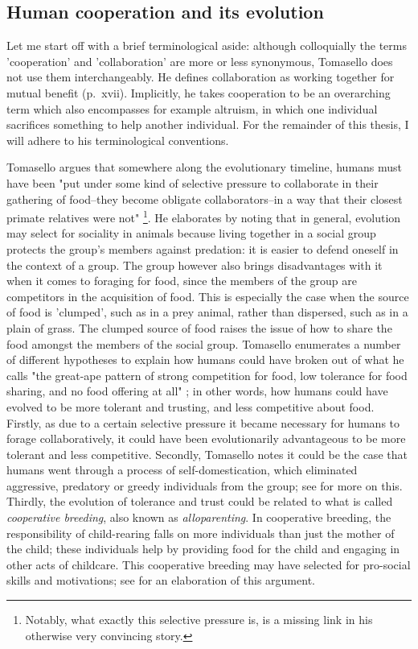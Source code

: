 \subsection{Human cooperation and its evolution}
\label{sec:comm:cooperation}

Let me start off with a brief terminological aside: although colloquially the terms 'cooperation' and 'collaboration' are more or less synonymous, Tomasello does not use them interchangeably. He defines collaboration as working together for mutual benefit (p.~xvii). Implicitly, he takes cooperation to be an overarching term which also encompasses for example altruism, in which one individual sacrifices something to help another individual. For the remainder of this thesis, I will adhere to his terminological conventions.

Tomasello argues that somewhere along the evolutionary timeline, humans must have been "put under some kind of selective pressure to collaborate in their gathering of food--they become obligate collaborators--in a way that their closest primate relatives were not" \citep[p.~75]{Tomasello09}\footnote{Notably, what exactly this selective pressure is, is a missing link in his otherwise very convincing story.}.
He elaborates by noting that in general, evolution may select for sociality in animals because living together in a social group protects the group's members against predation: it is easier to defend oneself in the context of a group. The group however also brings disadvantages with it when it comes to foraging for food, since the members of the group are competitors in the acquisition of food. This is especially the case when the source of food is 'clumped', such as in a prey animal, rather than dispersed, such as in a plain of grass. The clumped source of food raises the issue of how to share the food amongst the members of the social group.
Tomasello enumerates a number of different hypotheses to explain how humans could have broken out of what he calls "the great-ape pattern of strong competition for food, low tolerance for food sharing, and no food offering at all" \citep[p.~83]{Tomasello09}; in other words, how humans could have evolved to be more tolerant and trusting, and less competitive about food.
Firstly, as due to a certain selective pressure it became necessary for humans to forage collaboratively, it could have been evolutionarily advantageous to be more tolerant and less competitive.
Secondly, Tomasello notes it could be the case that humans went through a process of self-domestication, which eliminated aggressive, predatory or greedy individuals from the group; see \citet{Benitez21} for more on this.
Thirdly, the evolution of tolerance and trust could be related to what is called \emph{cooperative breeding}, also known as \emph{alloparenting}. In cooperative breeding, the responsibility of child-rearing falls on more individuals than just the mother of the child; these individuals help by providing food for the child and engaging in other acts of childcare. This cooperative breeding may have selected for pro-social skills and motivations; see \citet{Hrdy09} for an elaboration of this argument.

